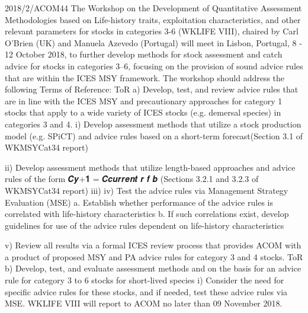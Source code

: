 \documentclass[a4paper,10pt]{article}
\title{}
\author{}
\date{}
\begin{document}
\maketitle

2018/2/ACOM44 The Workshop on the Development of Quantitative Assessment Methodologies based on Life-history traits, exploitation characteristics, and other relevant parameters for stocks in categories 3-6 (WKLIFE VIII), chaired by Carl O'Brien (UK) and Manuela Azevedo (Portugal) will meet in Lisbon, Portugal, 8 - 12 October 2018, to further develop methods for stock assessment and catch advice for stocks in categories 3–6, focusing on the provision of sound advice rules that are within the ICES MSY framework. The workshop should address the following Terms of Reference:
ToR a) Develop, test, and review advice rules that are in line with the ICES MSY and precautionary approaches for category 1 stocks that apply to a wide variety of ICES stocks (e.g. demersal species) in categories 3 and 4.
i) Develop assessment methods that utilize a stock production model (e.g. SPiCT) and advice rules based on a short-term forecast(Section 3.1 of WKMSYCat34 report)

ii) Develop assessment methods that utilize length-based approaches and advice rules of the form 𝑪𝒚+𝟏 = 𝑪𝒄𝒖𝒓𝒓𝒆𝒏𝒕 𝒓 𝒇 𝒃 (Sections 3.2.1 and 3.2.3 of WKMSYCat34 report) 
iii) 
iv) Test the advice rules via Management Strategy Evaluation (MSE)
a. Establish whether performance of the advice rules is correlated with life-history characteristics
b. If such correlations exist, develop guidelines for use of the advice rules dependent on life-history characteristics

v) Review all results via a formal ICES review process that provides ACOM with a product of proposed MSY and PA advice rules for category 3 and 4 stocks.
ToR b) Develop, test, and evaluate assessment methods and on the basis for an advice rule for category 3 to 6 stocks for short-lived species
i) Consider the need for specific advice rules for these stocks, and if needed, test these advice rules via MSE.
WKLIFE VIII will report to ACOM no later than 09 November 2018.
\end{document}
